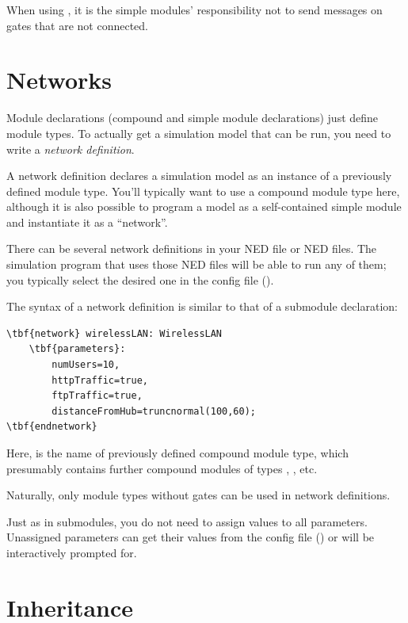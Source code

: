 When using , it is the
simple modules' responsibility not to send messages on gates
that are not connected.


\section{Networks}
\label{sec:ch-ned-lang:network}

Module declarations (compound and simple module declarations)
just define module types. To actually get a simulation model that
can be run, you need to write a \textit{network definition}.

A network definition declares a simulation model as an instance
of a previously defined module type. You'll typically want to use
a compound module type here, although it is also possible to
program a model as a self-contained simple module and instantiate it
as a ``network''.

There can be several network definitions in your NED file or NED files.
The simulation program that uses those NED files will be
able to run any of them; you typically select the desired one
in the config file ().

The syntax of a network definition is similar to that of a submodule
declaration:

\begin{Verbatim}[commandchars=\\\{\}]
\tbf{network} wirelessLAN: WirelessLAN
    \tbf{parameters}:
        numUsers=10,
        httpTraffic=true,
        ftpTraffic=true,
        distanceFromHub=truncnormal(100,60);
\tbf{endnetwork}
\end{Verbatim}

Here,  is the name of previously defined
compound module type, which presumably contains further
compound modules of types , , etc.

Naturally, only module types without gates can
be used in network definitions.

Just as in submodules, you do not need to assign values to all
parameters. Unassigned parameters can get their values from the
config file () or will be interactively prompted for.

\section{Inheritance}

